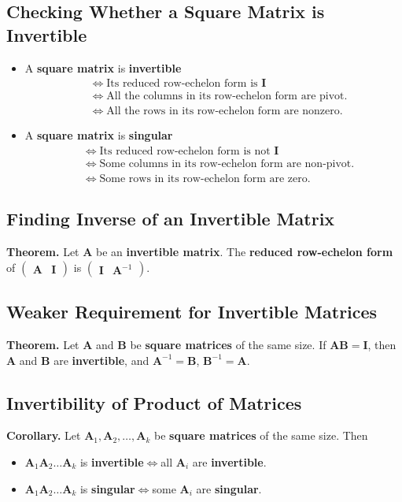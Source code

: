 \documentclass[../ma2001_notes.tex]{subfiles}
\begin{document}
\subsection{Checking Whether a Square Matrix is Invertible}
\begin{itemize}
	\item A \textbf{square matrix} is \textbf{invertible}
	\begin{align*}
		&\iff\text{Its reduced row-echelon form is }\bm{I} \\
		&\iff\text{All the columns in its row-echelon form are pivot}. \\
		&\iff\text{All the rows in its row-echelon form are nonzero}.
	\end{align*}
	\item A \textbf{square matrix} is \textbf{singular}
	\begin{align*}
		&\iff\text{Its reduced row-echelon form is not }\bm{I} \\
		&\iff\text{Some columns in its row-echelon form are non-pivot}. \\
		&\iff\text{Some rows in its row-echelon form are zero}.
	\end{align*}
\end{itemize}

\subsection{Finding Inverse of an Invertible Matrix}
\textbf{Theorem.} Let \(\bm{A}\) be an \textbf{invertible matrix}. The \textbf{reduced row-echelon form} of \(\left(\begin{array}{c|c}
	\bm{A} & \bm{I}
\end{array}\right)\) is \(\left(\begin{array}{c|c}
	\bm{I} & \bm{A}^{-1}
\end{array}\right)\).

\subsection{Weaker Requirement for Invertible Matrices}
\textbf{Theorem.} Let \(\bm{A}\) and \(\bm{B}\) be \textbf{square matrices} of the same size. If \(\bm{AB}=\bm{I}\), then \(\bm{A}\) and \(\bm{B}\) are \textbf{invertible}, and \(\bm{A}^{-1}=\bm{B}\), \(\bm{B}^{-1}=\bm{A}\).

\subsection{Invertibility of Product of Matrices}
\textbf{Corollary.} Let \(\bm{A}_1,\bm{A}_2,\ldots,\bm{A}_k\) be \textbf{square matrices} of the same size. Then
\begin{itemize}
	\item\(\bm{A}_1\bm{A}_2\ldots\bm{A}_k\) is \textbf{invertible}\(\iff\)all \(\bm{A}_i\) are \textbf{invertible}.
	\item\(\bm{A}_1\bm{A}_2\ldots\bm{A}_k\) is \textbf{singular}\(\iff\)some \(\bm{A}_i\) are \textbf{singular}.
\end{itemize}
\end{document}

